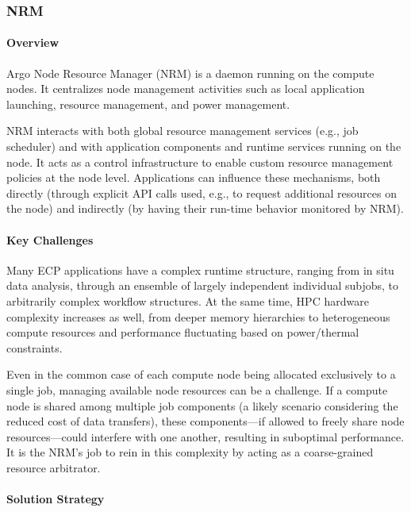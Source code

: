 \subsubsection*{NRM}

\paragraph{Overview}

Argo Node Resource Manager (NRM) is a daemon running on the compute
nodes. It centralizes node management activities such as local application
launching, resource management, and power management.

NRM interacts with both global resource management services (e.g., job
scheduler) and with application components and runtime services running on
the node. It acts as a control infrastructure to enable custom resource
management policies at the node level.  Applications can influence these
mechanisms, both directly (through explicit API calls used, e.g., to
request additional resources on the node) and indirectly (by having their
run-time behavior monitored by NRM).

\paragraph{Key Challenges}

Many ECP applications have a complex runtime structure, ranging from in
situ data analysis, through an ensemble of largely independent individual
subjobs, to arbitrarily complex workflow structures.  At the same time, HPC
hardware complexity increases as well, from deeper memory hierarchies to
heterogeneous compute resources and performance fluctuating based on
power/thermal constraints.

Even in the common case of each compute node being allocated exclusively to
a single job, managing available node resources can be a challenge.  If a
compute node is shared among multiple job components (a likely scenario
considering the reduced cost of data transfers), these components---if
allowed to freely share node resources---could interfere with one another,
resulting in suboptimal performance.  It is the NRM's job to rein in this
complexity by acting as a coarse-grained resource arbitrator.

\paragraph{Solution Strategy}


